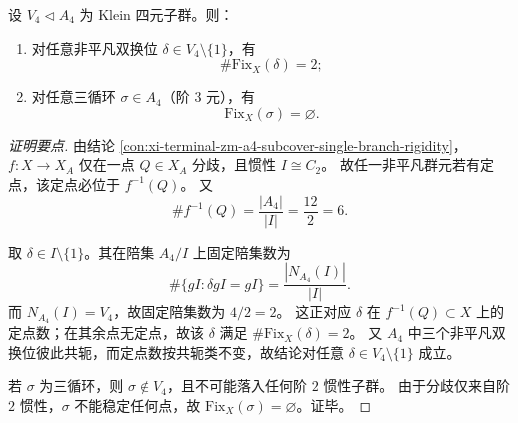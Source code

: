 \begin{conclusion}\label{con:xi-terminal-zm-a4-fixedpoint-spectrum-v4-c3}
设 \(V_4\lhd A_4\) 为 Klein 四元子群。则：
\begin{enumerate}
  \item 对任意非平凡双换位 \(\delta\in V_4\setminus\{1\}\)，有
  \[
  \#\mathrm{Fix}_X(\delta)=2;
  \]
  \item 对任意三循环 \(\sigma\in A_4\)（阶 \(3\) 元），有
  \[
  \mathrm{Fix}_X(\sigma)=\varnothing.
  \]
\end{enumerate}
\end{conclusion}
\begin{proof}[证明要点]
由结论 \ref{con:xi-terminal-zm-a4-subcover-single-branch-rigidity}，\(f:X\to X_A\) 仅在一点 \(Q\in X_A\) 分歧，且惯性 \(I\cong C_2\)。
故任一非平凡群元若有定点，该定点必位于 \(f^{-1}(Q)\)。
又
\[
\#f^{-1}(Q)=\frac{|A_4|}{|I|}=\frac{12}{2}=6.
\]

取 \(\delta\in I\setminus\{1\}\)。其在陪集 \(A_4/I\) 上固定陪集数为
\[
\#\{gI:\delta gI=gI\}
=\frac{|N_{A_4}(I)|}{|I|}.
\]
而 \(N_{A_4}(I)=V_4\)，故固定陪集数为 \(4/2=2\)。
这正对应 \(\delta\) 在 \(f^{-1}(Q)\subset X\) 上的定点数；在其余点无定点，故该 \(\delta\) 满足 \(\#\mathrm{Fix}_X(\delta)=2\)。
又 \(A_4\) 中三个非平凡双换位彼此共轭，而定点数按共轭类不变，故结论对任意 \(\delta\in V_4\setminus\{1\}\) 成立。

若 \(\sigma\) 为三循环，则 \(\sigma\notin V_4\)，且不可能落入任何阶 \(2\) 惯性子群。
由于分歧仅来自阶 \(2\) 惯性，\(\sigma\) 不能稳定任何点，故 \(\mathrm{Fix}_X(\sigma)=\varnothing\)。证毕。
\end{proof}

\endinput
